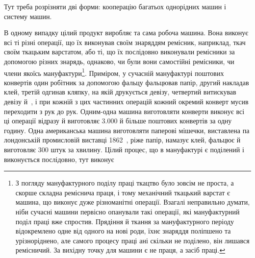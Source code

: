 Тут треба розрізняти дві форми: кооперацію багатьох однорідних
машин і систему машин.

В одному випадку цілий продукт виробляє та сама робоча
машина. Вона виконує всі ті різні операції, що їх виконував своїм
знаряддям ремісник, наприклад, ткач своїм ткацьким варстатом,
або ті, що їх послідовно виконували ремісники за допомогою
різних знарядь, однаково, чи були вони самостійні ремісники,
чи члени якоїсь мануфактури\footnote{
З погляду мануфактурного поділу праці ткацтво було зовсім не
проста, а скорше складна реміснича праця, і тому механічний ткацький
варстат є машина, що виконує дуже різноманітні операції. Взагалі неправильно
думати, ніби сучасні машини первісно опанували такі операції,
які мануфактурний поділ праці вже спростив. Прядіння й ткання за мануфактурного
періоду відокремлено одне від одного на нові роди, їхнє знаряддя
поліпшено та урізноріднено, але самого процесу праці ані скільки
не поділено, він лишався ремісничий. За вихідну точку для машини є не
праця, а засіб праці.
}. Приміром, у сучасній мануфактурі
поштових конвертів один робітник за допомогою фальцу
фальцював папір, другий накладав клей, третій одгинав кляпку,
на якій друкується девізу, четвертий витискував девізу й~,
і при кожній з цих частинних операцій кожний окремий конверт
мусив переходити з рук до рук. Одним-одна машина виготовляти
конверти виконує всі ці операції відразу й виготовляє \num{3.000} й
більше поштових конвертів за одну годину. Одна американська
машина виготовляти паперові мішечки, виставлена па лондонській
промисловій виставці 1862~, ріже папір, намазує клей,
фальцює й виготовляє 300 штук за хвилину. Цілий процес, що в
мануфактурі є поділений і виконується послідовно, тут виконує
\parbreak{}  %
